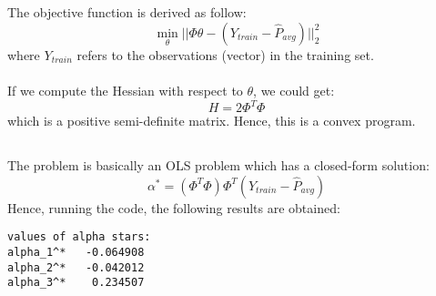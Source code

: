 \documentclass[12pt]{article}
\begin{document}
\subsection{}
The objective function is derived as follow:
\begin{equation}
\min_{\theta}||\Phi\theta-(Y_{train}-\hat{P}_{avg})||_2^2
\end{equation}
where $Y_{train}$ refers to the observations (vector) in the training set.\\\\ 
If we compute the Hessian with respect to $\theta$, we could get:
\begin{equation}
H=2\Phi^T\Phi
\end{equation}
which is a positive semi-definite matrix. Hence, this is a convex program.
\subsection{}
The problem is basically an OLS problem which has a closed-form solution:
\begin{equation}
\alpha^*=(\Phi^T\Phi)\Phi^T(Y_{train}-\hat{P}_{avg})
\end{equation} 
Hence, running the code, the following results are obtained:
\begin{verbatim}
values of alpha stars:
alpha_1^*   -0.064908
alpha_2^*   -0.042012
alpha_3^*    0.234507
\end{verbatim}
\end{document}
